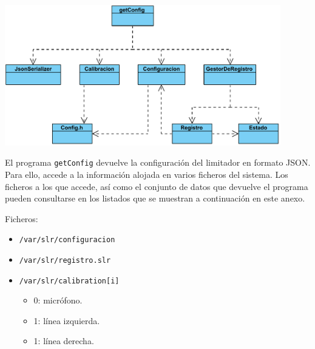 
\begin{center}
    \includegraphics[width=0.9\textwidth]{figuras/lms11-getConfig.pdf}
    \label{fig:getConfig}
\end{center}

El programa \verb|getConfig| devuelve la configuración del limitador en formato JSON. Para ello, accede a la información alojada en varios ficheros del sistema. Los ficheros a los que accede, así como el conjunto de datos que devuelve el programa pueden consultarse en los listados que se muestran a continuación en este anexo.

Ficheros:
\begin{multicols}{2}
	\begin{itemize}
	    \item \verb|/var/slr/configuracion|
	    \item \verb|/var/slr/registro.slr|
	    \item \verb|/var/slr/calibration[i]|
	    \begin{itemize}
	        \item 0: micrófono.
	        \item 1: línea izquierda.
	        \item 1: línea derecha.
	    \end{itemize}
	\end{itemize}
\end{multicols}

